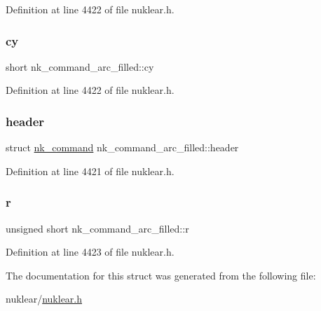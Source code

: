 Definition at line 4422 of file nuklear.\+h.

\mbox{\label{structnk__command__arc__filled_a256160e8fe2a191ce9932e83f6cb2b07}} 
\subsubsection{\texorpdfstring{cy}{cy}}
{\footnotesize\ttfamily short nk\+\_\+command\+\_\+arc\+\_\+filled\+::cy}



Definition at line 4422 of file nuklear.\+h.

\mbox{\label{structnk__command__arc__filled_a5dab5721944b118c5baae25ab8654ecb}} 
\subsubsection{\texorpdfstring{header}{header}}
{\footnotesize\ttfamily struct \mbox{\hyperlink{structnk__command}{nk\+\_\+command}} nk\+\_\+command\+\_\+arc\+\_\+filled\+::header}



Definition at line 4421 of file nuklear.\+h.

\mbox{\label{structnk__command__arc__filled_a31784cc181f33422ea8b09bc01463937}} 
\subsubsection{\texorpdfstring{r}{r}}
{\footnotesize\ttfamily unsigned short nk\+\_\+command\+\_\+arc\+\_\+filled\+::r}



Definition at line 4423 of file nuklear.\+h.



The documentation for this struct was generated from the following file\+:\begin{DoxyCompactItemize}
\item 
nuklear/\mbox{\hyperlink{nuklear_8h}{nuklear.\+h}}\end{DoxyCompactItemize}
